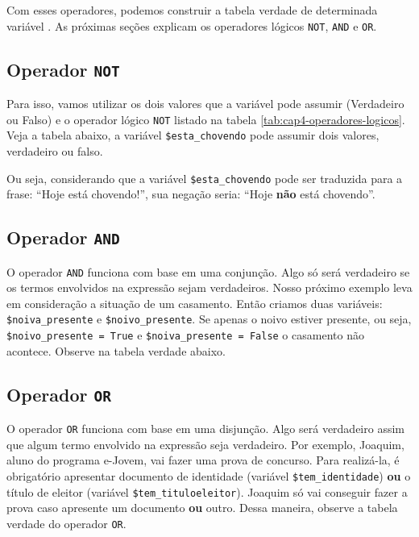 

Com esses operadores, podemos construir a tabela verdade de determinada variável \booleana.
As próximas seções explicam os operadores lógicos \texttt{NOT}, \texttt{AND} e \texttt{OR}.

\subsection{Operador \texttt{NOT}}
\label{operador-not}

Para isso, vamos utilizar os dois valores que a variável pode assumir (Verdadeiro ou Falso)
e o operador lógico \texttt{NOT} listado na tabela \ref{tab:cap4-operadores-logicos}.
Veja a tabela abaixo, a variável \texttt{\$esta\_chovendo} pode assumir dois valores,
verdadeiro ou falso.



Ou seja, considerando que a variável \texttt{\$esta\_chovendo} pode ser traduzida para
a frase: ``Hoje está chovendo!'', sua negação seria: ``Hoje \textbf{não} está chovendo''.

\subsection{Operador \texttt{AND}}
\label{operador-and}

O operador \texttt{AND} funciona com base em uma conjunção. Algo só será verdadeiro
se os termos envolvidos na expressão sejam verdadeiros. Nosso próximo exemplo leva em 
consideração a situação de um casamento. Então criamos duas variáveis: \texttt{\$noiva\_presente} 
e \texttt{\$noivo\_presente}. Se apenas o noivo estiver presente, ou seja,
\texttt{\$noivo\_presente = True} e \texttt{\$noiva\_presente = False} o casamento não acontece. 
Observe na tabela verdade abaixo.



\subsection{Operador \texttt{OR}}
\label{operador-or}

O operador \texttt{OR} funciona com base em uma disjunção. Algo será verdadeiro
assim que algum termo envolvido na expressão seja verdadeiro. Por exemplo, Joaquim,
aluno do programa e-Jovem, vai fazer uma prova de concurso. Para realizá-la, é 
obrigatório apresentar documento de identidade (variável \texttt{\$tem\_identidade})
\textbf{ou} o título de eleitor (variável \texttt{\$tem\_tituloeleitor}).
Joaquim só vai conseguir fazer a prova caso apresente um documento \textbf{ou} outro.
Dessa maneira, observe a tabela verdade do operador \texttt{OR}.

